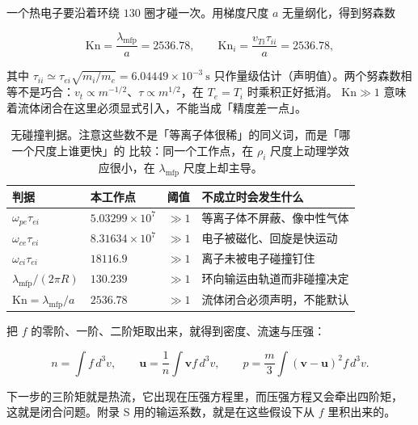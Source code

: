 一个热电子要沿着环绕 $130$ 圈才碰一次。用梯度尺度 $a$ 无量纲化，得到努森数

\begin{equation}
\mathrm{Kn}=\frac{\lambda_{\mathrm{mfp}}}{a}=2536.78,\qquad
\mathrm{Kn}_i=\frac{v_{Ti}\tau_{ii}}{a}=2536.78 ,
\label{eq:app-ae-kn}
\end{equation}

其中 $\tau_{ii}\simeq\tau_{ei}\sqrt{m_i/m_e}=6.04449\times10^{-3}\ \mathrm{s}$ 只作量级估计（声明值）。两个努森数相等不是巧合：$v_t\propto m^{-1/2}$、$\tau\propto m^{1/2}$，在 $T_e=T_i$ 时乘积正好抵消。
$\mathrm{Kn}\gg1$ 意味着流体闭合在这里必须显式引入，不能当成「精度差一点」。

\begin{table}[htbp]
\centering
\small
\caption{无碰撞判据。注意这些数不是「等离子体很稀」的同义词，而是「哪一个尺度上谁更快」的
比较：同一个工作点，在 $\rho_i$ 尺度上动理学效应很小，在 $\lambda_{\mathrm{mfp}}$ 尺度上却主导。}
\label{tab:app-ae-collisionless}
\begin{tabular}{p{3.6cm}p{3.0cm}p{3.4cm}p{4.0cm}}
\toprule
判据 & 本工作点 & 阈值 & 不成立时会发生什么 \\
\midrule
$\omega_{pe}\tau_{ei}$ & $5.03299\times10^{7}$ & $\gg1$ & 等离子体不屏蔽、像中性气体 \\
$\omega_{ce}\tau_{ei}$ & $8.31634\times10^{7}$ & $\gg1$ & 电子被磁化、回旋是快运动 \\
$\omega_{ci}\tau_{ei}$ & $18116.9$ & $\gg1$ & 离子未被电子碰撞钉住 \\
$\lambda_{\mathrm{mfp}}/(2\pi R)$ & $130.239$ & $\gg1$ & 环向输运由轨道而非碰撞决定 \\
$\mathrm{Kn}=\lambda_{\mathrm{mfp}}/a$ & $2536.78$ & $\gg1$ & 流体闭合必须声明，不能默认 \\
\bottomrule
\end{tabular}

\end{table}

把 $f$ 的零阶、一阶、二阶矩取出来，就得到密度、流速与压强：

\begin{equation}
n=\int f\,d^3v,\qquad
\mathbf{u}=\frac{1}{n}\int\mathbf{v}f\,d^3v,\qquad
p=\frac{m}{3}\int(\mathbf{v}-\mathbf{u})^2f\,d^3v .
\label{eq:app-ae-moments}
\end{equation}

下一步的三阶矩就是热流，它出现在压强方程里，而压强方程又会牵出四阶矩，
这就是闭合问题。附录 S 用的输运系数，就是在这些假设下从 $f$ 里积出来的。

